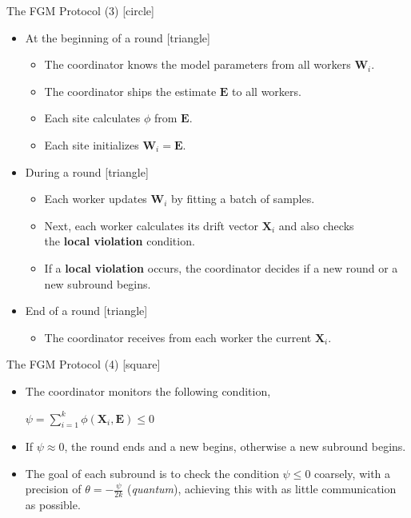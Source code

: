 \begin{frame}{The FGM Protocol (3)}
    [circle]
    \begin{itemize}
        \item{At the beginning of a round
        [triangle]
        \begin{itemize}
            \item{The coordinator knows the model parameters from all workers $\pmb{W}_i$.}
            \item{The coordinator ships the estimate $\pmb{E}$ to all workers.}
            \item{Each site calculates $\phi$ from $\pmb{E}$.}
            \item{Each site initializes $\pmb{W}_i=\pmb{E}$.}
        \end{itemize}
        }
        \item{During a round
        [triangle]
        \begin{itemize}
            \item{Each worker updates $\pmb{W}_i$ by fitting a batch of samples.}
            \item{Next, each worker calculates its drift vector $\pmb{X}_i$ and also checks\\the \textbf{local violation} condition.}
            \item{If a \textbf{local violation} occurs, the coordinator decides if a new round or a new subround begins.}
        \end{itemize}
        }
        \item{End of a round
        [triangle]
        \begin{itemize}
            \item{The coordinator receives from each worker the current $\pmb{X}_i$.}
        \end{itemize}
        }
    \end{itemize}
\end{frame}

\begin{frame}{The FGM Protocol (4)}
    [square]
    \begin{itemize}
        \item{The coordinator monitors the following condition,\\
        \begin{center}
            $\psi = \sum_{i=1}^k\phi(\pmb{X}_i,\pmb{E}) \leq 0$
        \end{center}
        }
        \item{If $\psi\approx0$, the round ends and a new begins, otherwise a new subround begins.}
        \item{The goal of each subround is to check the condition $\psi \leq 0$ coarsely, with a precision of $\theta = -\frac{\psi}{2k}$ (\emph{quantum}), achieving
        this with as little communication as possible.}
    \end{itemize}
\end{frame}